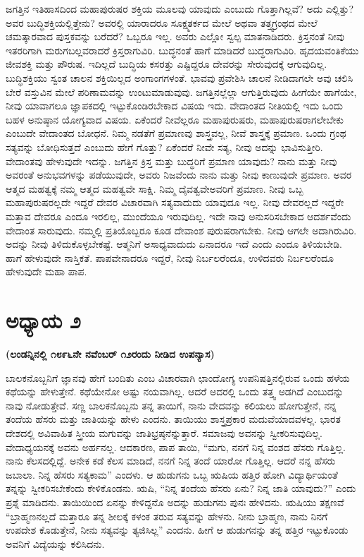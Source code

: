 ಜಗತ್ತಿನ ಇತಿಹಾಸದಿಂದ ಮಹಾಪುರುಷರ ಶಕ್ತಿಯ ಮೂಲವು ಯಾವುದು ಎಂಬುದು ಗೊತ್ತಾಗಿಲ್ಲವೆ? ಅದು ಎಲ್ಲಿತ್ತು? ಅವರ ಬುದ್ಧಿಶಕ್ತಿಯಲ್ಲಿತ್ತೇನು? ಅವರಲ್ಲಿ ಯಾರಾದರೂ ಸೂಕ್ಷ್ಮತರ್ಕದ ಮೇಲೆ ಅಥವಾ ತತ್ತ್ವಗ್ರಂಥದ ಮೇಲೆ ಚಮತ್ಕಾರವಾದ ಪುಸ್ತಕವನ್ನು ಬರೆದರೆ? ಒಬ್ಬರೂ ಇಲ್ಲ. ಅವರು ಎಲ್ಲೋ ಸ್ವಲ್ಪ ಮಾತನಾಡಿದರು. ಕ್ರಿಸ್ತನಂತೆ ನೀವು ಇತರರಿಗಾಗಿ ಮರುಗಬಲ್ಲವರಾದರೆ ಕ್ರಿಸ್ತರಾಗುವಿರಿ. ಬುದ್ಧನಂತೆ ಹಾಗೆ ಮಾಡಿದರೆ ಬುದ್ಧರಾಗುವಿರಿ. ಹೃದಯವಂತಿಕೆಯು ಜೀವಶಕ್ತಿ ಮತ್ತು ಪೌರುಷ. ಇದಿಲ್ಲದೆ ಬುದ್ಧಿಯ ಕಸರತ್ತು ಎಷ್ಟಿದ್ದರೂ ದೇವರನ್ನು ಸೇರುವುದಕ್ಕೆ ಆಗುವುದಿಲ್ಲ. ಬುದ್ಧಿಶಕ್ತಿಯು ಸ್ವಂತ ಚಾಲನ ಶಕ್ತಿಯಿಲ್ಲದ ಅಂಗಾಂಗಗಳಂತೆ. ಭಾವವು ಪ್ರವೇಶಿಸಿ ಚಾಲನೆ ನೀಡಿದಾಗಲೇ ಅವು ಚಲಿಸಿ ಬೇರೆ ವಸ್ತುವಿನ ಮೇಲೆ ಪರಿಣಾಮವನ್ನು ಉಂಟುಮಾಡುವುವು. ಜಗತ್ತಿನಲ್ಲೆಲ್ಲಾ ಆಗುತ್ತಿರುವುದು ಹೀಗೆಯೇ ಹಾಗೆಯೇ, ನೀವು ಯಾವಾಗಲೂ ಜ್ಞಾಪಕದಲ್ಲಿ ಇಟ್ಟುಕೊಂಡಿರಬೇಕಾದ ವಿಷಯ ಇದು. ವೇದಾಂತದ ನೀತಿಯಲ್ಲಿ ಇದು ಒಂದು ಬಹಳ ಅನುಷ್ಠಾನ ಯೋಗ್ಯವಾದ ವಿಷಯ. ಏಕೆಂದರೆ ನೀವೆಲ್ಲರೂ ಮಹಾಪುರುಷರು, ಮಹಾಪುರುಷರಾಗಲೇಬೇಕು ಎಂಬುದೇ ವೇದಾಂತದ ಬೋಧನೆ. ನಿಮ್ಮ ನಡತೆಗೆ ಪ್ರಮಾಣವು ಶಾಸ್ತ್ರವಲ್ಲ, ನೀವೆ ಶಾಸ್ತ್ರಕ್ಕೆ ಪ್ರಮಾಣ. ಒಂದು ಗ್ರಂಥ ಸತ್ಯವನ್ನು ಬೋಧಿಸುತ್ತದೆ ಎಂಬುದು ಹೇಗೆ ಗೊತ್ತು? ಏಕೆಂದರೆ ನೀವೇ ಸತ್ಯ, ನೀವು ಅದನ್ನು ಭಾವಿಸುತ್ತೀರಿ. ವೇದಾಂತವು ಹೇಳುವುದೇ ಇದನ್ನು. ಜಗತ್ತಿನ ಕ್ರಿಸ್ತ ಮತ್ತು ಬುದ್ಧರಿಗೆ ಪ್ರಮಾಣ ಯಾವುದು? ನಾನು ಮತ್ತು ನೀವು ಅವರಂತೆ ಅನುಭವಗಳನ್ನು ಪಡೆಯುವುದೇ, ಅವರು ನಿಜವೆಂದು ನಾನು ಮತ್ತು ನೀವು ಕಾಣುವುದೇ ಪ್ರಮಾಣ. ಅವರ ಆತ್ಮದ ಮಹತ್ವಕ್ಕೆ ನಮ್ಮ ಆತ್ಮದ ಮಹತ್ವವೇ ಸಾಕ್ಷಿ. ನಿಮ್ಮ ದೈವತ್ವವೇ\break ಅವರಿಗೆ ಪ್ರಮಾಣ. ನೀವು ಒಬ್ಬ ಮಹಾಪುರುಷರಲ್ಲದೇ ಇದ್ದರೆ ದೇವರ ವಿಚಾರವಾಗಿ ಸತ್ಯವಾದುದು ಯಾವುದೂ ಇಲ್ಲ. ನೀವು ದೇವರಲ್ಲದೆ ಇದ್ದರೇ ಮತ್ತಾವ ದೇವರೂ ಎಂದೂ ಇರಲಿಲ್ಲ, ಮುಂದೆಯೂ ಇರುವುದಿಲ್ಲ. ಇದೇ ನಾವು ಅನುಸರಿಸಬೇಕಾದ ಆದರ್ಶವೆಂದು ವೇದಾಂತ ಸಾರುವುದು. ನಮ್ಮಲ್ಲಿ ಪ್ರತಿಯೊಬ್ಬರೂ ಕೂಡ ದೇವಾಂಶ ಪುರುಷರಾಗಬೇಕು. ನೀವು ಆಗಲೇ ಅದಾಗಿರುವಿರಿ. ಅದನ್ನು ನೀವು ತಿಳಿದುಕೊಳ್ಳಬೇಕಷ್ಟೆ. ಆತ್ಮನಿಗೆ ಅಸಾಧ್ಯವಾದುದು ಏನಾದರೂ ಇದೆ ಎಂದು ಎಂದೂ ತಿಳಿಯಬೇಡಿ. ಹಾಗೆ ಹೇಳುವುದೇ ನಾಸ್ತಿಕತೆ. ಪಾಪವೇನಾದರೂ ಇದ್ದರೆ, ನೀವು ನಿರ್ಬಲರೆಂದೂ, ಉಳಿದವರು ನಿರ್ಬಲರೆಂದೂ ಹೇಳುವುದೇ ಮಹಾ ಪಾಪ.

\chapter{ಅಧ್ಯಾಯ ೨}

\begin{center}
\textbf{(ಲಂಡನ್ನಿನಲ್ಲಿ ೧೮೯೬ನೇ ನವೆಂಬರ್​ ೧೨ರಂದು ನೀಡಿದ ಉಪನ್ಯಾಸ)}
\end{center}

ಬಾಲಕನೊಬ್ಬನಿಗೆ ಜ್ಞಾನವು ಹೇಗೆ ಬಂದಿತು ಎಂಬ ವಿಚಾರವಾಗಿ ಛಾಂದೋಗ್ಯ ಉಪನಿಷತ್ತಿನಲ್ಲಿರುವ ಒಂದು ಹಳೆಯ ಕಥೆಯನ್ನು ಹೇಳುತ್ತೇನೆ. ಕಥೆಯೇನೋ ಅಷ್ಟು ನಯವಾಗಿಲ್ಲ. ಆದರೆ ಅದರಲ್ಲಿ ಒಂದು ತತ್ತ್ವ ಅಡಗಿದೆ ಎಂಬುದನ್ನು ನಾವು ನೋಡುತ್ತೇವೆ. ಸಣ್ಣ ಬಾಲಕನೊಬ್ಬನು ತನ್ನ ತಾಯಿಗೆ, ನಾನು ವೇದವನ್ನು ಕಲಿಯಲು ಹೋಗುತ್ತೇನೆ, ನನ್ನ ತಂದೆಯ ಹೆಸರು ಮತ್ತು ಜಾತಿಯನ್ನು ಹೇಳು ಎಂದನು. ತಾಯಿಯು ಶಾಸ್ತ್ರಪ್ರಕಾರ ಮದುವೆಯಾದವಳಲ್ಲ. ಭಾರತ ದೇಶದಲ್ಲಿ ಅವಿವಾಹಿತ ಸ್ತ್ರೀಯ ಮಗುವನ್ನು ಜಾತಿಭ್ರಷ್ಠನೆನ್ನುತ್ತಾರೆ. ಸಮಾಜವು ಅವನನ್ನು ಸ್ವೀಕರಿಸುವುದಿಲ್ಲ. ವೇದಾಧ್ಯಯನಕ್ಕೆ ಅವನು ಅರ್ಹನಲ್ಲ. ಆದಕಾರಣ, ಪಾಪ ತಾಯಿ, “ಮಗು, ನನಗೆ ನಿನ್ನ ವಂಶದ ಹೆಸರು ಗೊತ್ತಿಲ್ಲ. ನಾನು ಕೆಲಸದಲ್ಲಿದ್ದೆ. ಅನೇಕ ಕಡೆ ಕೆಲಸ ಮಾಡಿದೆ, ನನಗೆ ನಿನ್ನ ತಂದೆ ಯಾರೋ ಗೊತ್ತಿಲ್ಲ. ಆದರೆ ನನ್ನ ಹೆಸರು ಜಬಾಲಾ. ನಿನ್ನ ಹೆಸರು ಸತ್ಯಕಾಮ” ಎಂದಳು. ಆ ಹುಡುಗನು ಒಬ್ಬ ಋಷಿಯ ಹತ್ತಿರ ಹೋಗಿ ವಿದ್ಯಾರ್ಥಿಯಂತೆ ತನ್ನನ್ನು ಸ್ವೀಕರಿಸಬೇಕೆಂದು ಕೇಳಿಕೊಂಡನು. ಋಷಿ, “ನಿನ್ನ ತಂದೆಯ ಹೆಸರು ಏನು? ನಿನ್ನ ಜಾತಿ ಯಾವುದು?” ಎಂದು ಪ್ರಶ್ನೆ ಮಾಡಿದನು. ತಾಯಿಯಿಂದ ಏನನ್ನು ಕೇಳಿದ್ದನೊ ಅದನ್ನು ಹುಡುಗನು ಪುನಃ ಹೇಳಿದನು. ಋಷಿಯು ತಕ್ಷಣವೆ “ಬ್ರಾಹ್ಮಣನಲ್ಲದೆ ಮತ್ತಾರೂ ತನ್ನ ಶೀಲಕ್ಕೆ ಕಳಂಕ ತರುವ ಸತ್ಯವನ್ನು ಹೇಳನು. ನೀನು ಬ್ರಾಹ್ಮಣ, ನಾನು ನಿನಗೆ ಉಪದೇಶ ಕೊಡುತ್ತೇನೆ, ನೀನು ಸತ್ಯವನ್ನು ತ್ಯಜಿಸಿಲ್ಲ” ಎಂದನು. ಹೀಗೆ ಆ ಹುಡುಗನನ್ನು ತನ್ನ ಹತ್ತಿರ ಇಟ್ಟುಕೊಂಡು ಅವನಿಗೆ ವಿದ್ಯೆಯನ್ನು ಕಲಿಸಿದನು. 

